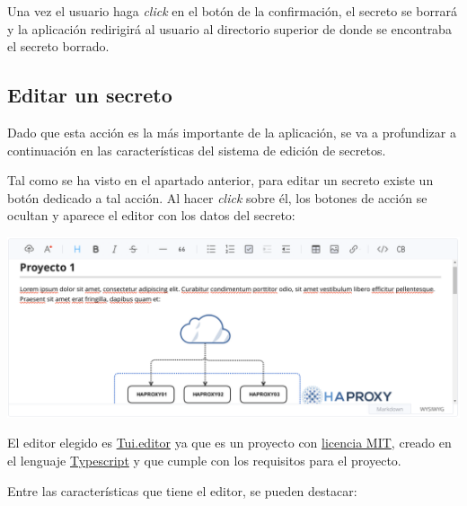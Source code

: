 \documentclass{\ClassPath/viu-tfm-template}
\begin{document}
Una vez el usuario haga \textit{click} en el botón de la confirmación, el secreto se borrará y la aplicación redirigirá al usuario al directorio superior de donde se encontraba el secreto borrado.

\subsection{Editar un secreto}

Dado que esta acción es la más importante de la aplicación, se va a profundizar a continuación en las características del sistema de edición de secretos.

Tal como se ha visto en el apartado anterior, para editar un secreto existe un botón dedicado a tal acción. Al hacer \textit{click} sobre él, los botones de acción se ocultan y aparece el editor con los datos del secreto:

\begin{center}
    \includegraphics[width=\linewidth]{img/editor.png}
\end{center}

El editor elegido es \href{https://github.com/nhn/tui.editor}{Tui.editor} ya que es un proyecto con \href{https://es.wikipedia.org/wiki/Licencia_MIT}{licencia MIT}, creado en el lenguaje \href{https://es.wikipedia.org/wiki/TypeScript}{Typescript} y que cumple con los requisitos para el proyecto.

Entre las características que tiene el editor, se pueden destacar:
\end{document}
